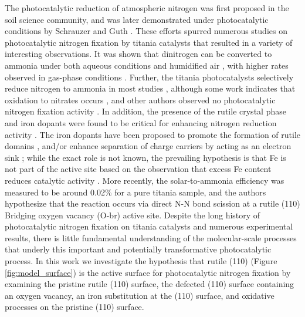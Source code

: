 \documentclass[journal=ascecg,manuscript=article,articletitle=true]{achemso}
\begin{document}
The photocatalytic reduction of atmospheric nitrogen was first proposed in the soil science community\cite{Dhar_1941}, and was later demonstrated under photocatalytic conditions by Schrauzer and Guth \cite{Schrauzer_1977,Schrauzer_1983}. These efforts spurred numerous studies on photocatalytic nitrogen fixation by titania catalysts \cite{Bickley_1979,Augugliaro_1982,Soria_1991,Schrauzer_2011, Yuan_2013,Hirakawa_2017, Medford_2017} that resulted in a variety of interesting observations. It was shown that dinitrogen can be converted to ammonia under both aqueous conditions \cite{Augugliaro_1982,Hirakawa_2017} and humidified air \cite{Schrauzer_1977,Schrauzer_1983}, with higher rates observed in gas-phase conditions \cite{Schrauzer_2011}. Further, the titania photocatalysts selectively reduce nitrogen to ammonia in most studies \cite{Schrauzer_1977,Schrauzer_1983,Augugliaro_1982,Soria_1991,Schrauzer_2011,Hirakawa_2017}, although some work indicates that oxidation to nitrates occurs \cite{Bickley_1979,Yuan_2013}, and other authors observed no photocatalytic nitrogen fixation activity \cite{edwards1992opinion,davies1993reply,Boucher_1995,Davies1995}. In addition, the presence of the rutile crystal phase and iron dopants were found to be critical for enhancing nitrogen reduction activity \cite{Schrauzer_1977,Schrauzer_1983,Augugliaro_1982,Soria_1991}. The iron dopants have been proposed to promote the formation of rutile domains \cite{Schrauzer_1977}, and/or enhance separation of charge carriers by acting as an electron sink \cite{Soria_1991}; while the exact role is not known, the prevailing hypothesis is that Fe is not part of the active site based on the observation that excess Fe content reduces catalytic activity \cite{Soria_1991}. More recently, the solar-to-ammonia efficiency was measured to be around 0.02\% for a pure titania sample, and the authors hypothesize that the reaction occurs via direct N-N bond scission at a rutile (110) Bridging oxygen vacancy (O-br) active site.\cite{Hirakawa_2017} Despite the long history of photocatalytic nitrogen fixation on titania catalysts and numerous experimental results, there is little fundamental understanding of the molecular-scale processes that underly this important and potentially transformative photocatalytic process. In this work we investigate the hypothesis that rutile (110) (Figure \ref{fig:model_surface}) is the active surface for photocatalytic nitrogen fixation by examining the pristine rutile (110) surface, the defected (110) surface containing an oxygen vacancy, an iron substitution at the (110) surface, and oxidative processes on the pristine (110) surface.
\end{document}
